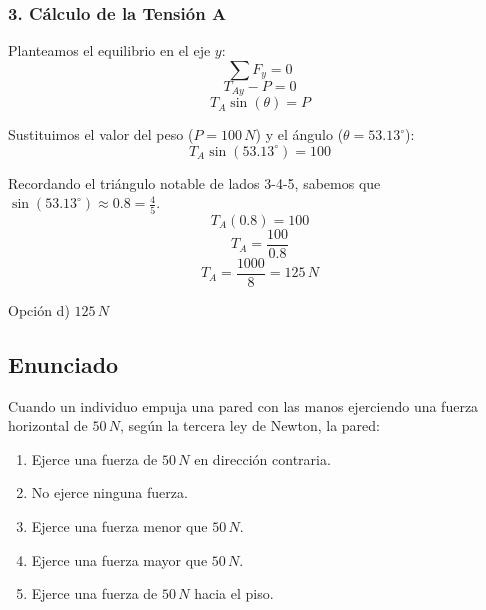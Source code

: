 \documentclass[12pt, a4paper]{article}
\begin{document}
\subsubsection*{3. Cálculo de la Tensión A}
Planteamos el equilibrio en el eje $y$:
$$ \sum F_y = 0 $$
$$ T_{Ay} - P = 0 $$
$$ T_A \sin(\theta) = P $$

Sustituimos el valor del peso ($P = 100 \, \si{N}$) y el ángulo ($\theta = 53.13^\circ$):
$$ T_A \sin(53.13^\circ) = 100 $$

Recordando el triángulo notable de lados 3-4-5, sabemos que $\sin(53.13^\circ) \approx 0.8 = \frac{4}{5}$.
$$ T_A (0.8) = 100 $$
$$ T_A = \frac{100}{0.8} $$
$$ T_A = \frac{1000}{8} = 125 \, \si{N} $$

\begin{tcolorbox}[colback=green!5!white, colframe=green!50!black, title=Respuesta Final]
\centering Opción d) $125 \, \si{N}$
\end{tcolorbox}

\newpage

\subsection*{Enunciado}
Cuando un individuo empuja una pared con las manos ejerciendo una fuerza horizontal de $50 \, \si{N}$, según la tercera ley de Newton, la pared:
\begin{enumerate}[label=\alph*)]
    \item Ejerce una fuerza de $50 \, \si{N}$ en dirección contraria.
    \item No ejerce ninguna fuerza.
    \item Ejerce una fuerza menor que $50 \, \si{N}$.
    \item Ejerce una fuerza mayor que $50 \, \si{N}$.
    \item Ejerce una fuerza de $50 \, \si{N}$ hacia el piso.
\end{enumerate}

\begin{center}
\end{center}
\end{document}
